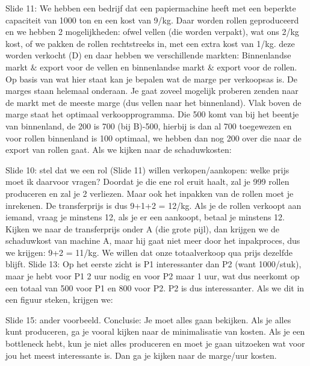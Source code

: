 \documentclass[10pt,a4paper]{report}
\begin{document}
Slide 11: We hebben een bedrijf dat een papiermachine heeft met een beperkte capaciteit van 1000 ton en een kost van 9/kg. Daar worden rollen geproduceerd en we hebben 2 mogelijkheden: ofwel vellen (die worden verpakt), wat ons 2/kg kost, of we pakken de rollen rechtstreeks in, met een extra kost van 1/kg. deze worden verkocht (D) en daar hebben we verschillende markten: Binnenlandse markt $\&$ export voor de vellen en binnenlandse markt $\&$ export voor de rollen. Op basis van wat hier staat kan je bepalen wat de marge per verkoopsas is. De marges staan helemaal onderaan. Je gaat zoveel mogelijk proberen zenden naar de markt met de meeste marge (dus vellen naar het binnenland). Vlak boven de marge staat het optimaal verkoopprogramma. Die 500 komt van bij het beentje van binnenland, de 200 is 700 (bij B)-500, hierbij is dan al 700 toegewezen en voor rollen binnenland is 100 optimaal, we hebben dan nog 200 over die naar de export van rollen gaat.
Als we kijken naar de schaduwkosten: 
























Slide 10: stel dat we een rol (Slide 11) willen verkopen/aankopen: welke prijs moet ik daarvoor vragen? Doordat je die ene rol eruit haalt, zal je 999 rollen produceren en zal je 2 verliezen. Maar ook het inpakken van de rollen moet je inrekenen. De transferprijs is dus 9+1+2 = 12/kg. Als je de rollen verkoopt aan iemand, vraag je minstens 12, als je er een aankoopt, betaal je minstens 12.
Kijken we naar de transferprijs onder A (die grote pijl), dan krijgen we de schaduwkost van machine A, maar hij gaat niet meer door het inpakproces, dus we krijgen: 9+2 = 11/kg. We willen dat onze totaalverkoop qua prijs dezelfde blijft.
Slide 13: Op het eerste zicht is P1 interessanter dan P2 (want 1000/stuk), maar je hebt voor P1 2 uur nodig en voor P2 maar 1 uur, wat dus neerkomt op een totaal van 500 voor P1 en 800 voor P2. P2 is dus interessanter. Als we dit in een figuur steken, krijgen we:


















Slide 15: ander voorbeeld.
Conclusie: Je moet alles gaan bekijken. Als je alles kunt produceren, ga je vooral kijken naar de minimalisatie van kosten. Als je een bottleneck hebt, kun je niet alles produceren en moet je gaan uitzoeken wat voor jou het meest interessante is. Dan ga je kijken naar de marge/uur kosten. 
\end{document}
